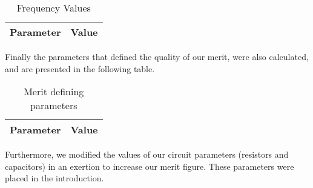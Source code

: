 \begin{table}[h]
  \centering
  \begin{tabular}{|l|r|}
    \hline    
    {\bf Parameter} & {\bf Value} \\ \hline
    
  \end{tabular}
  \caption{ Frequency Values }
\end{table}
\par
Finally the parameters that defined the quality of our merit, were also calculated, and are presented in the following table.

\begin{table}[h]
  \centering
  \begin{tabular}{|l|r|}
    \hline    
    {\bf Parameter} & {\bf Value} \\ \hline
    
  \end{tabular}
  \caption{ Merit defining parameters  }
\end{table}

Furthermore, we modified the values of our circuit parameters (resistors and capacitors) in an exertion to increase our merit figure. These parameters were placed in the introduction.




